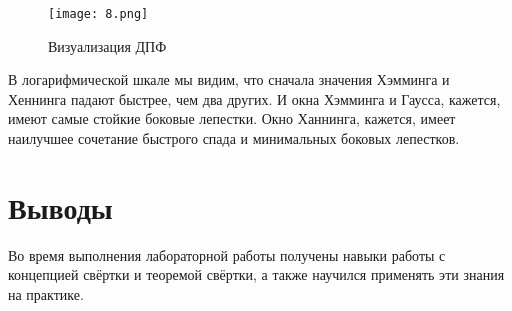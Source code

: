 \documentclass[a4paper,12pt]{report}
\begin{document}
\begin{figure}[H]
        \centering
        \texttt{[image: 8.png]}
        \caption{Визуализация ДПФ}
        \label{fig:lab8_fig3_3}
\end{figure}

В логарифмической шкале мы видим, что сначала значения Хэмминга и Хеннинга падают быстрее, чем два других. И окна Хэмминга и Гаусса, кажется, имеют самые стойкие боковые лепестки. Окно Ханнинга, кажется, имеет наилучшее сочетание быстрого спада и минимальных боковых лепестков.

\chapter{Выводы}

Во время выполнения лабораторной работы получены навыки работы с концепцией свёртки и теоремой свёртки, а также научился применять эти знания на практике.
\end{document}
